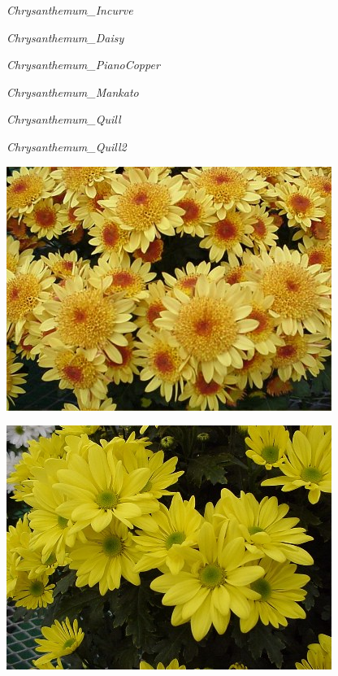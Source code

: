 \documentclass{article}
\begin{document}
\noindent
\vfill
\centerline{{\Large\emph{Chrysanthemum_Incurve}}}
\vfill
\newpage

\noindent
\vfill
\centerline{{\Large\emph{Chrysanthemum_Daisy}}}
\vfill
\newpage

\noindent
\vfill
\centerline{{\Large\emph{Chrysanthemum_PianoCopper}}}
\vfill
\newpage

\noindent
\vfill
\centerline{{\Large\emph{Chrysanthemum_Mankato}}}
\vfill
\newpage

\noindent
\vfill
\centerline{{\Large\emph{Chrysanthemum_Quill}}}
\vfill
\newpage

\noindent
\vfill
\centerline{{\Large\emph{Chrysanthemum_Quill2}}}
\vfill
\newpage

\begin{center}
\includegraphics[height=0.9\textheight, angle=90]{../Chrysanthemum_Anemone.jpg}
\end{center}
\newpage

\begin{center}
\includegraphics[height=0.9\textheight, angle=90]{../Chrysanthemum_Butterfield.jpg}
\end{center}
\newpage
\end{document}
